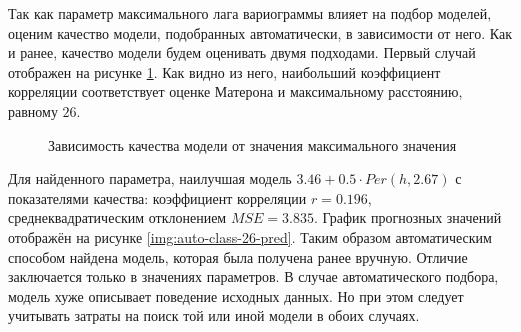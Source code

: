 Так как параметр максимального лага вариограммы влияет на подбор моделей, оценим качество модели, подобранных автоматически, в зависимости от него. Как и ранее, качество модели будем оценивать двумя подходами. Первый случай отображен на рисунке \ref{img:auto-corr-cutoff}. Как видно из него, наибольший коэффициент корреляции соответствует оценке Матерона и максимальному расстоянию, равному $ 26 $.
\begin{figure}[ht]
\caption{Зависимость качества модели от значения максимального значения}
\label{img:auto-corr-cutoff}
\end{figure}
Для найденного параметра, наилучшая модель $ 3.46 + 0.5 \cdot Per(h, 2.67) $ с показателями качества: коэффициент корреляции $ r = 0.196 $, среднеквадратическим отклонением $ MSE = 3.835 $. График прогнозных значений отображён на рисунке \ref{img:auto-class-26-pred}. Таким образом автоматическим способом найдена модель, которая была получена ранее вручную. Отличие заключается только в значениях параметров. В случае автоматического подбора, модель хуже описывает поведение исходных данных. Но при этом следует учитывать затраты на поиск той или иной модели в обоих случаях.

